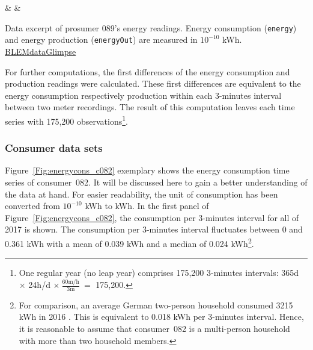 \begin{table}[htbp]
    {\csvcolii & \csvcoliii & \csvcoliv}%
    \caption[Data excerpt of prosumer~089's energy readings]{Data excerpt of prosumer 089's energy readings. Energy consumption (\texttt{energy}) and energy production (\texttt{energyOut}) are measured in $10^{-10}$ kWh. \quantnet\href{https://github.com/QuantLet/BLEM/tree/master/BLEMdataGlimpse}{BLEMdataGlimpse}}
    \label{Tab:p089}
\end{table}
%

For further computations, the first differences of the energy consumption and production readings were calculated. These first differences are equivalent to the energy consumption respectively production within each 3-minutes interval between two meter recordings. The result of this computation leaves each time series with 175,200 observations\footnote{One regular year (no leap year) comprises 175,200 3-minutes intervals: 365d $\times$ 24h/d $\times~\frac{60\text{m/h}}{3\text{m}}~=$ 175,200.}.



\subsubsection{Consumer data sets}

Figure~\ref{Fig:energycons_c082} exemplary shows the energy consumption time series of consumer~082. It will be discussed here to gain a better understanding of the data at hand. For easier readability, the unit of consumption has been converted from $10^{-10}$ kWh to kWh. In the first panel of Figure~\ref{Fig:energycons_c082}, the consumption per 3-minutes interval for all of 2017 is shown. The consumption per 3-minutes interval fluctuates between 0 and 0.361 kWh with a mean of 0.039 kWh and a median of 0.024 kWh\footnote{For comparison, an average German two-person household consumed 3215 kWh in 2016 \citep{Destatis:2018}. This is equivalent to 0.018 kWh per 3-minutes interval. Hence, it is reasonable to assume that consumer~082 is a multi-person household with more than two household members.}.

